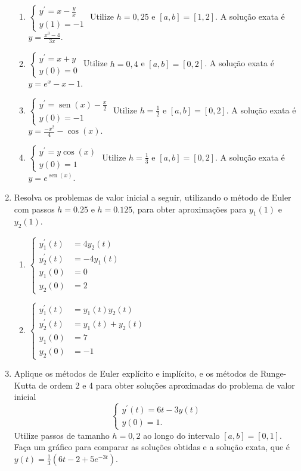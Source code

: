 \documentclass[12pt,a4paper]{article}
\newcommand*\sen{\operatorname{sen}}
\begin{document}
\begin{enumerate}
\begin{enumerate}
\item $\begin{cases}
y^\prime = x-\frac{y}{x} \\
y(1) = -1
\end{cases}$
Utilize $h = 0,25$ e $[a,b] = [1, 2]$. A solução exata é $y = \frac{x^3 - 4}{3x}$.
\item $\begin{cases}
y^\prime = x+y \\
y(0) = 0
\end{cases}$
Utilize $h = 0,4$ e $[a,b] = [0, 2]$. A solução exata é $y = e^x - x - 1$.
\item $\begin{cases}
y^\prime = \sen(x) - \frac{x}{2} \\
y(0) = -1
\end{cases}$
Utilize $h = \frac{1}{2}$ e $[a,b] = [0,2]$. A solução exata é $y = \frac{-x^2}{4} - \cos(x)$.
\item $\begin{cases}
y^\prime = y \cos(x) \\
y(0) = 1
\end{cases}$
Utilize $h = \frac{1}{3}$ e $[a,b] = [0,2]$. A solução exata é $y = e^{\sen(x)}$.
\end{enumerate}

\item Resolva os problemas de valor inicial a seguir, utilizando o método de Euler com passos $h = 0.25$ e $h=0.125$, para obter aproximações para $y_1(1)$ e $y_2(1)$.
\begin{multicols}{2}
\begin{enumerate}
\item $\begin{cases}
y_1^\prime(t) &= 4y_2(t)\\
y_2^\prime(t) &= -4y_1(t)\\
y_1(0) &= 0\\
y_2(0) &= 2
\end{cases}$

\item $\begin{cases}
y_1^\prime(t) &= y_1(t) y_2(t)\\
y_2^\prime(t) &= y_1(t)+y_2(t)\\
y_1(0) &= 7\\
y_2(0) &= -1
\end{cases}$
\end{enumerate}
\end{multicols}

\item Aplique os métodos de Euler explícito e implícito, e os métodos de Runge-Kutta de ordem 2 e 4 para obter soluções aproximadas do problema de valor inicial
\[
\begin{cases}
y^\prime(t) = 6t - 3y(t) \\
y(0) = 1.
\end{cases}\]
Utilize passos de tamanho $h = 0,2$ ao longo do intervalo $[a, b] = [0, 1]$. Faça um gráfico para comparar as soluções obtidas e a solução exata, que é $y(t) = \frac{1}{3} (6 t - 2 + 5 e^{-3 t})$.
\end{enumerate}
\end{document}
